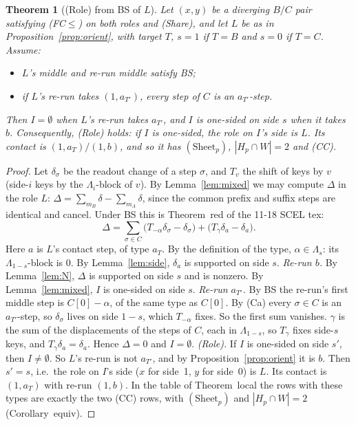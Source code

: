 \documentclass[11pt]{article}
\newtheorem{theorem}{Theorem}\newtheorem{lemma}[theorem]{Lemma}\newtheorem{proposition}[theorem]{Proposition}
\theoremstyle{definition}\newtheorem{definition}[theorem]{Definition}\newtheorem{remark}[theorem]{Remark}
\begin{document}
\begin{theorem}[(Role) from BS of $L$]\label{thm:main}
Let $(x,y)$ be a diverging $B/C$ pair satisfying \textup{(FC$\le$)} on both roles and \textup{(Share)}, and let $L$ be as in Proposition~\ref{prop:orient}, with target $T$, $s=1$ if $T=B$ and $s=0$ if $T=C$. Assume:
\begin{itemize}
\item[\textbf{BS$(L)$}] $L$'s middle and re-run middle satisfy BS;
\item[\textbf{(Ca)}] if $L$'s re-run takes $(1,a_{T'})$, every step of $C$ is an $a_{T'}$-step.
\end{itemize}
Then $I=\emptyset$ when $L$'s re-run takes $a_{T'}$, and $I$ is one-sided on side $s$ when it takes $b$. Consequently, \textup{(Role)} holds: if $I$ is one-sided, the role on $I$'s side is $L$. Its contact is $(1,a_T)/(1,b)$, and so it has $(\mathrm{Sheet}_p)$, $|H_p\cap W|=2$ and \textup{(CC)}.
\end{theorem}
\begin{proof}
Let $\delta_\sigma$ be the readout change of a step $\sigma$, and $T_v$ the shift of keys by $v$ (side-$i$ keys by the $\Lambda_i$-block of $v$). By Lemma~\ref{lem:mixed} we may compute $\Delta$ in the role $L$: $\Delta=\sum_{m_B}\delta-\sum_{m_A}\delta$, since the common prefix and suffix steps are identical and cancel. Under BS this is Theorem~red of the 11-18 SCEL tex:
\[\Delta=\sum_{\sigma\in C}\bigl(T_{-\alpha}\delta_\sigma-\delta_\sigma\bigr)+\bigl(T_\gamma\delta_a-\delta_a\bigr).\]
Here $a$ is $L$'s contact step, of type $a_T$. By the definition of the type, $\alpha\in\Lambda_s$: its $\Lambda_{1-s}$-block is $0$. By Lemma~\ref{lem:side}, $\delta_a$ is supported on side $s$.
\emph{Re-run $b$.} By Lemma~\ref{lem:N}, $\Delta$ is supported on side $s$ and is nonzero. By Lemma~\ref{lem:mixed}, $I$ is one-sided on side $s$.
\emph{Re-run $a_{T'}$.} By BS the re-run's first middle step is $C[0]-\alpha$, of the same type as $C[0]$. By (Ca) every $\sigma\in C$ is an $a_{T'}$-step, so $\delta_\sigma$ lives on side $1-s$, which $T_{-\alpha}$ fixes. So the first sum vanishes. $\gamma$ is the sum of the displacements of the steps of $C$, each in $\Lambda_{1-s}$, so $T_\gamma$ fixes side-$s$ keys, and $T_\gamma\delta_a=\delta_a$. Hence $\Delta=0$ and $I=\emptyset$.
\emph{(Role).} If $I$ is one-sided on side $s'$, then $I\ne\emptyset$. So $L$'s re-run is not $a_{T'}$, and by Proposition~\ref{prop:orient} it is $b$. Then $s'=s$, i.e.\ the role on $I$'s side ($x$ for side~1, $y$ for side~0) is $L$. Its contact is $(1,a_T)$ with re-run $(1,b)$. In the table of Theorem~local the rows with these types are exactly the two (CC) rows, with $(\mathrm{Sheet}_p)$ and $|H_p\cap W|=2$ (Corollary~equiv).
\end{proof}
\end{document}
